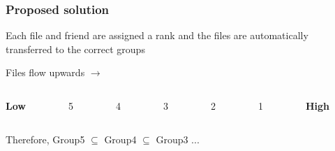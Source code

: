 \documentclass{beamer}
\begin{document}
  \begin{frame}
    \frametitle{Proposed solution}
    Each file and friend are assigned a rank and the files are automatically transferred to the correct groups \\
    \vspace*{0.5cm}
   \begin{center}
    Files flow upwards $\boldsymbol{\longrightarrow}$
    \vspace*{-1cm}
   \end{center}
    \begin{columns}
    \begin{column}[T]{1cm}
     \begin{center}
      \textbf{Low} 
     \end{center} 
     \end{column}
     
     \begin{column}[T]{1cm}
     \begin{center}
      5
     \end{center} 
     \end{column}

     \begin{column}[T]{1cm}
     \begin{center}
     4
     \end{center} 
     \end{column}
     
     \begin{column}[T]{1cm}
     \begin{center}
      3
     \end{center} 
     \end{column}
     
     \begin{column}[T]{1cm}
     \begin{center}
      2
     \end{center} 
     \end{column}
     
     \begin{column}[T]{1cm}
     \begin{center}
      1
     \end{center} 
     \end{column}
     
     \begin{column}[T]{1cm}
     \begin{center}
      \textbf{High}
     \end{center} 
     \end{column}
    \end{columns}
    \vspace*{1.5cm}
    Therefore, Group5 $\subseteq$ Group4 $\subseteq$ Group3 ...
  \end{frame}
  
\end{document}
